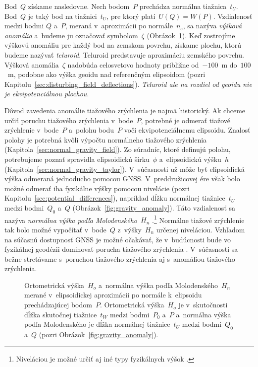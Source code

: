 \documentclass[a4paper, 12pt]{book}
\begin{document}
Bod~$Q$ získame nasledovne.  Nech bodom~$P$ prechádza normálna tiažnica~$t_U$.  
Bod~$Q$ je taký bod na tiažnici~$t_U$, pre ktorý platí~$U(Q) = W(P)$.  
Vzdialenosť medzi bodmi $Q$ a~$P$, meraná v~aproximácii po normále~$n_e$, sa 
nazýva \emph{výšková anomália} a~budeme ju označovať symbolom~$\zeta$ 
(Obrázok~\ref{fig:heights}).  Keď zostrojíme výškovú anomáliu pre každý bod na 
zemskom povrchu, získame plochu, ktorú budeme nazývať \emph{teluroid}.  
Teluroid predstavuje aproximáciu zemského povrchu.  Výšková anomália~$\zeta$ 
nadobúda celosvetovo hodnoty približne od~$-100$~m do~$100$~m, podobne ako 
výška geoidu nad referenčným elipsoidom (pozri 
Kapitolu~\ref{sec:disturbing_field_deflections}).  \emph{Teluroid ale na 
rozdiel od geoidu nie je ekvipotenciálnou plochou}.

Dôvod zavedenia anomálie tiažového zrýchlenia je najmä historický.  Ak chceme 
určiť poruchu tiažového zrýchlenia v~bode~$P$, potrebné je odmerať tiažové 
zrýchlenie v~bode~$P$ a~polohu bodu~$P$ voči ekvipotenciálnemu elipsoidu.  
Znalosť polohy je potrebná kvôli výpočtu normálneho tiažového zrýchlenia 
(Kapitola~\ref{sec:normal_gravity_field}).  Zo súradníc, ktoré definujú polohu, 
potrebujeme poznať spravidla elipsoidickú šírku~$\phi$ a~elipsoidickú výšku~$h$ 
(Kapitola~\ref{sec:normal_gravity_taylor}).  V~súčasnosti už môže byť 
elipsoidická výška odmeraná jednoducho pomocou GNSS.  V~preddružicovej ére však 
bolo možné odmerať iba fyzikálne výšky pomocou nivelácie (pozri 
Kapitolu~\ref{sec:potential_differences}), napríklad dĺžku normálnej 
tiažnice~$t_U$ medzi bodmi~$Q_0$ a~$Q$ (Obrázok~\ref{fig:gravity_anomaly}).  
Táto vzdialenosť sa nazýva \emph{normálna výška podľa Molodenského}~$H_n$ 
\parencite{MoritzPhysicalGeodesy}.\footnote{Niveláciou je možné určiť aj iné 
typy fyzikálnych výšok \parencite[pozri][]{MoritzPhysicalGeodesy}.}  Normálne 
tiažové zrýchlenie tak bolo možné vypočítať v~bode~$Q$ z~výšky~$H_n$ určenej 
niveláciou.  Vzhľadom na súčasnú dostupnosť GNSS je možné očakávať, že 
v~budúcnosti bude vo fyzikálnej geodézii dominovať porucha tiažového zrýchlenia 
\parencite{MoritzPhysicalGeodesy}.  V~súčasnosti sa bežne stretávame s~poruchou 
tiažového zrýchlenia aj s~anomáliou tiažového zrýchlenia.

\begin{figure}[bt]
\centering

\caption{Ortometrická výška~$H_o$ a~normálna výška podľa Molodenského~$H_n$ 
merané v~elipsoidickej aproximácii po normále k~elipsoidu prechádzajúcej 
bodom~$P$.  Ortometrická výška~$H_o$ je v~skutočnosti dĺžka skutočnej 
tiažnice~$t_W$ medzi bodmi~$P_0$ a~$P$ a~normálna výška podľa Molodenského je 
dĺžka normálnej tiažnice~$t_U$ medzi bodmi~$Q_0$ a~$Q$ (pozri 
Obrázok~\ref{fig:gravity_anomaly}).}
\label{fig:heights}
\end{figure}
\end{document}
